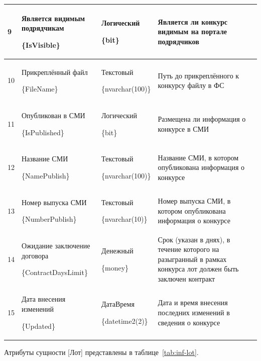 \begin{footnotesize}
\begin{longtable}[h]{|p{}|p{}|p{}|p{}|}
	9 & Является видимым подрядчикам \par \{IsVisible\} & Логический \par \{bit\} & Является ли конкурс видимым на портале подрядчиков \\ \hline
	10 & Прикреплённый файл \par \{FileName\} & Текстовый \par \{nvarchar(100)\} & Путь до прикреплённого к конкурсу файлу в ФС \\ \hline
	11 & Опубликован в СМИ \par \{IsPublished\} & Логический \par \{bit\} & Размещена ли информация о конкурсе в СМИ \\ \hline
	12 & Название СМИ \par \{NamePublish\} & Текстовый \par \{nvarchar(100)\} & Название СМИ, в котором опубликована информация о конкурсе \\ \hline
	13 & Номер выпуска СМИ \par \{NumberPublish\} & Текстовый \par \{nvarchar(10)\} & Номер выпуска СМИ, в котором опубликована информация о конкурсе \\ \hline
	14 & Ожидание заключение договора \par \{ContractDaysLimit\} & Денежный \par \{money\} & Срок (указан в днях), в течение которого на разыгранный в рамках конкурса лот должен быть заключен контракт \\ \hline
	15 & Дата внесения изменений \par \{Updated\} & ДатаВремя \par \{datetime2(2)\} & Дата и время внесения последних изменений в сведения о конкурсе \\ \hline
\end{longtable}
\end{footnotesize}

Атрибуты сущности [Лот] представлены в таблице~\ref{tab:inf-lot}.

